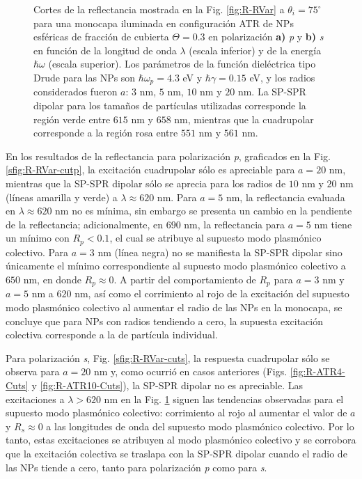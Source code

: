 \begin{figure}[h!]
	\caption{Cortes de la reflectancia mostrada en la Fig. \ref{fig:R-RVar} a $\theta_i = 75^\circ$ para una monocapa iluminada en configuración ATR de NPs esféricas de fracción de cubierta $\Theta = 0.3$ en polarización \textbf{a)} \emph{p} y \textbf{b)} \emph{s} en función de la longitud de onda $\lambda$ (escala inferior) y de la energía $\hbar\omega$ (escala superior). Los parámetros de la función dieléctrica tipo Drude para las NPs son $\hbar\omega_p = 4.3$ eV y $\hbar\gamma = 0.15$ eV, y los radios  considerados fueron $a$: $3$ nm, $5$ nm, $10$ nm y $20$ nm. La SP-SPR dipolar para los tamaños de partículas utilizadas corresponde la región verde entre $615$ nm y $658$ nm, mientras que la cuadrupolar corresponde a la región rosa entre $551$ nm y $561$ nm.}\label{fig:R-RVar-Cuts}
	\end{figure}	

En los resultados de la reflectancia para polarización \emph{p}, graficados en la Fig. \ref{sfig:R-RVar-cutp}, la excitación cuadrupolar sólo es apreciable para $a=20$ nm, mientras que la SP-SPR dipolar sólo se aprecia para los radios de $10$ nm y $20$ nm (líneas amarilla y verde) a $\lambda\approx 620$ nm. Para $a=5$ nm, la reflectancia evaluada en $\lambda\approx 620$ nm no es mínima, sin embargo se presenta un cambio en la pendiente de la reflectancia; adicionalmente, en $690$ nm, la reflectancia para $a=5$ nm tiene un mínimo con $R_p<0.1$, el cual se atribuye al supuesto modo plasmónico colectivo. Para $a=3$ nm (línea negra) no se manifiesta la SP-SPR dipolar sino únicamente el mínimo correspondiente al supuesto modo plasmónico colectivo a $650$ nm, en donde $R_p\approx 0$. A partir del comportamiento de $R_p$ para $a=3$ nm y $a=5$ nm a $620$ nm, así como el corrimiento al rojo de la excitación del supuesto modo plasmónico colectivo al aumentar el radio de las NPs en la monocapa, se concluye que para NPs con radios tendiendo a cero, la supuesta excitación colectiva corresponde a la de partícula individual.
 
 Para polarización \emph{s}, Fig. \ref{sfig:R-RVar-cuts}, la respuesta cuadrupolar sólo se observa para $a = 20$ nm y, como ocurrió en casos anteriores (Figs. \ref{fig:R-ATR4-Cuts} y \ref{fig:R-ATR10-Cuts}), la SP-SPR dipolar no es apreciable. Las excitaciones a $\lambda>620$ nm en la Fig. \ref{fig:R-RVar-Cuts} siguen las tendencias observadas para el supuesto modo plasmónico colectivo: corrimiento al rojo al aumentar el valor de $a$ y $R_s\approx 0$ a las longitudes de onda del supuesto modo plasmónico colectivo. Por lo tanto, estas excitaciones se atribuyen al modo plasmónico colectivo y se corrobora que la excitación colectiva se traslapa con la SP-SPR dipolar cuando el radio de las NPs tiende a cero, tanto para polarización \emph{p} como para \emph{s}.
 
